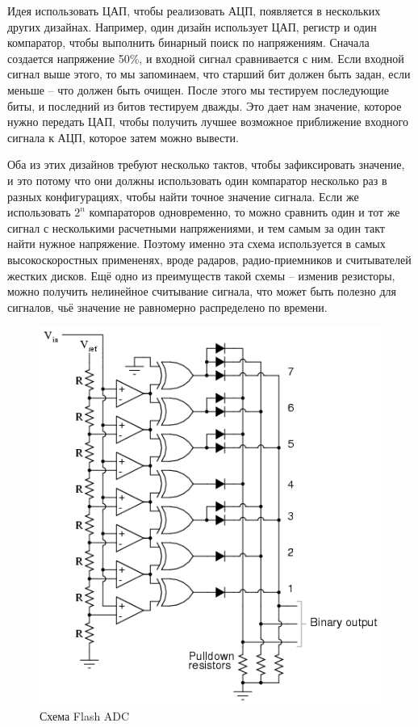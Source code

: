 \documentclass[a4page]{article}
\begin{document}
  Идея использовать ЦАП, чтобы реализовать АЦП, появляется в нескольких других дизайнах.
  Например, один дизайн использует ЦАП, регистр и один компаратор, чтобы выполнить бинарный поиск по напряжениям.
  Сначала создается напряжение 50\%, и входной сигнал сравнивается с ним.
  Если входной сигнал выше этого, то мы запоминаем, что старший бит должен быть задан,
  если меньше -- что должен быть очищен.
  После этого мы тестируем последующие биты,
  и последний из битов тестируем дважды.
  Это дает нам значение, которое нужно передать ЦАП, чтобы получить лучшее возможное приближение входного сигнала к АЦП,
  которое затем можно вывести.


  Оба из этих дизайнов требуют несколько тактов, чтобы зафиксировать значение,
  и это потому что они должны использовать один компаратор несколько раз в разных конфигурациях, чтобы найти точное значение сигнала.
  Если же использовать $2^n$ компараторов одновременно, то можно сравнить один и тот же сигнал с несколькими расчетными напряжениями,
  и тем самым за один такт найти нужное напряжение.
  Поэтому именно эта схема используется в самых высокоскоростных примененях, вроде радаров, радио-приемников и считывателей жестких дисков.
  Ещё одно из преимуществ такой схемы -- изменив резисторы, можно получить нели\-нейное считывание сигнала, что может быть полезно для сигналов,
  чьё значение не равномерно распределено по времени.


  \begin{figure}
    \includegraphics[width=\linewidth]{flash-adc.png}
    \caption{Схема Flash ADC~\cite{web:digitalCircuitsAdc}}
    \label{fig:flash-adc}
  \end{figure}
\end{document}
